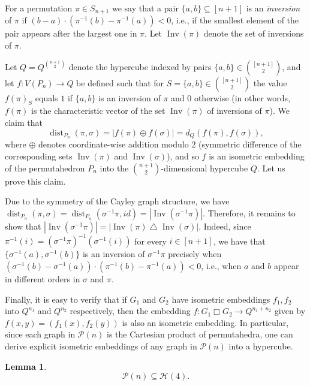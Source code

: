 \documentclass[reqno,a4paper,11pt]{amsart}
\newtheorem{lemma}[theorem]{Lemma}
\theoremstyle{definition}
\newcommand{\car}{\mathbin{\Box}}
\newcommand{\symdif}{\mathbin{\triangle}}
\newcommand{\dist}{\operatorname{dist}}
\newcommand{\Inv}{\operatorname{Inv}}
\begin{document}
For a permutation $\pi \in S_{n+1}$ we say that a pair $\{a, b\} \subseteq [n+1]$ is an \emph{inversion} of $\pi$ if $(b-a) \cdot (\pi^{-1}(b) - \pi^{-1}(a)) < 0$, i.e., if the smallest element of the pair appears after the largest one in $\pi$.
Let $\Inv(\pi)$ denote the set of inversions of $\pi$.

Let $Q = Q^{\binom{n+1}{2}}$ denote the hypercube indexed by pairs $\{a, b\} \in \binom{[n+1]}{2}$, and let $f \colon V(P_n) \to Q$ be defined such that for $S = \{a, b\} \in \binom{[n+1]}{2}$ the value $f(\pi)_{S}$ equals $1$ if $\{a, b\}$ is an inversion of $\pi$ and $0$ otherwise (in other words, $f(\pi)$ is the characteristic vector of the set $\Inv(\pi)$ of inversions of $\pi$).
We claim that
\[
  \dist_{P_n}(\pi, \sigma) = |f(\pi) \oplus f(\sigma)| = d_{Q}(f(\pi), f(\sigma)),
\]
where $\oplus$ denotes coordinate-wise addition modulo $2$ (symmetric difference of the corresponding sets $\Inv(\pi)$ and $\Inv(\sigma)$), and so $f$ is an isometric embedding of the permutahedron $P_n$ into the $\binom{n+1}{2}$-dimensional hypercube $Q$.
Let us prove this claim.

Due to the symmetry of the Cayley graph structure, we have $\dist_{P_n}(\pi, \sigma) = \dist_{P_n}(\sigma^{-1}\pi, id) = |\Inv(\sigma^{-1} \pi)|$.
Therefore, it remains to show that $|\Inv(\sigma^{-1}\pi)| = |\Inv(\pi) \symdif \Inv(\sigma)|$.
Indeed, since $\pi^{-1}(i) = (\sigma^{-1}\pi)^{-1}(\sigma^{-1}(i))$ for every $i \in [n+1]$, we have that $\{\sigma^{-1}(a), \sigma^{-1}(b)\}$ is an inversion of $\sigma^{-1}\pi$ precisely when $(\sigma^{-1}(b) - \sigma^{-1}(a)) \cdot (\pi^{-1}(b) - \pi^{-1}(a)) < 0$, i.e., when $a$ and $b$ appear in different orders in $\sigma$ and $\pi$.

Finally, it is easy to verify that if $G_1$ and $G_2$ have isometric embeddings $f_1,f_2$ into $Q^{n_1}$ and $Q^{n_2}$ respectively, then the embedding $f \colon G_1 \car G_2 \to Q^{n_1 + n_2}$ given by $f(x,y) = (f_1(x),f_2(y))$ is also an isometric embedding.
In particular, since each graph in $\mathcal{P}(n)$ is the Cartesian product of permutahedra, one can derive explicit isometric embeddings of any graph in $\mathcal{P}(n)$ into a hypercube.

\begin{lemma}\label{l:permutahedronH}
  \[
    \mathcal{P}(n) \subseteq \mathcal{H}(4).
  \]
\end{lemma}
\end{document}
